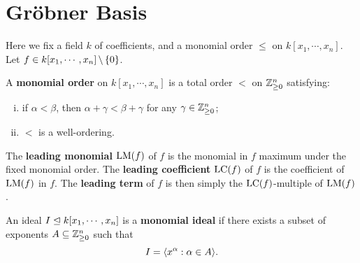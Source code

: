 \chapter{Gr\"obner Basis}

Here we fix a field \(k\) of coefficients, and a monomial order \(\le\) on
\(k[x_1, \cdots, x_n]\). Let \(f \in k[x_1, \cdots, x_n] \,\backslash\, \{ 0 \}\).

\begin{definition}
    \label{def:MonomialOrder}
    \leanok
    A \textbf{monomial order} on \(k[x_1, \cdots, x_n]\) is a total order \(<\)
    on \(\mathbb{Z}_{\ge 0}^n\) satisfying:
    \begin{enumerate}[(i)]
        \item if \(\alpha < \beta\), then \(\alpha + \gamma < \beta + \gamma\)
        for any \(\gamma \in \mathbb{Z}_{\ge 0}^n\);
        \item \(<\) is a well-ordering.
    \end{enumerate}
\end{definition}

\begin{definition} %
    \label{def:LeadingMonomialCoeff}
    \leanok
    The \textbf{leading monomial} \(\mathrm{LM}(f)\) of \(f\) is the monomial in
    \(f\) maximum under the fixed monomial order. The \textbf{leading coefficient}
    \(\mathrm{LC}(f)\) of \(f\) is the coefficient of \(\mathrm{LM}(f)\) in \(f\).
    The \textbf{leading term} of \(f\) is then simply the \(\mathrm{LC}(f)\)-multiple
    of \(\mathrm{LM}(f)\).
\end{definition}

\begin{definition} %
    \label{def:MonomialIdeal}
    \leanok
    An ideal \(I \trianglelefteq k[x_1, \cdots, x_n]\) is a \textbf{monomial ideal}
    if there exists a subset of exponents \(A \subseteq \mathbb{Z}_{\ge 0}^n\) such that
    \[I = \langle x^\alpha : \alpha \in A \rangle.\]
\end{definition}

\iffalse %
\begin{theorem}[Dickson's lemma] %
    \label{thm:DicksonLemma}
    \uses{def:MonomialIdeal}
    For any monomial ideal \(I = \sgen{x^\alpha : \alpha \in A} \idealle
    k[x_1, \cdots, x_n]\), there exists a finite subset \(A' \subseteq A\)
    such that \(I = \sgen{x^\alpha : \alpha \in A'}\).
\end{theorem}
\fi

